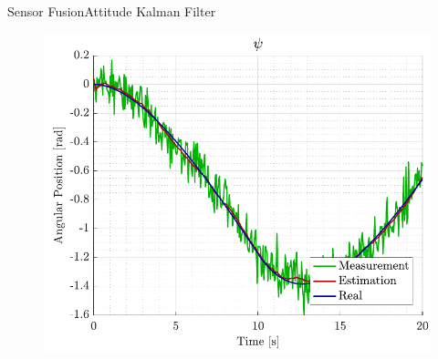 \begin{frame}{Sensor Fusion}{Attitude Kalman Filter}
    \begin{figure}[H]
        \centering
        \includegraphics[width=0.6\linewidth]{figures/sim_yaw}
    \end{figure}
\end{frame}

